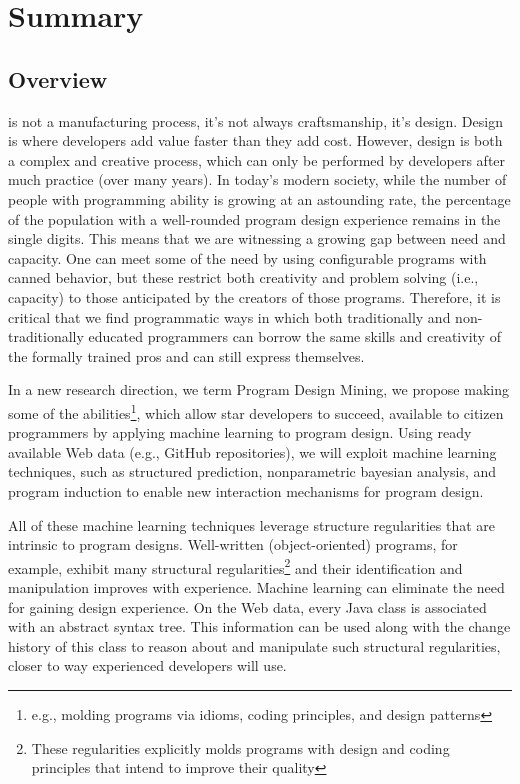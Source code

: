 \chapter{Summary}{}
\label{sec:intro}

\section*{Overview} %
\label{sec:overview}

 is not a manufacturing process, it's not 
always craftsmanship, it's design. Design is where developers add 
value faster than they add cost. However, design is both a complex 
and creative process, which can only be performed by developers after 
much practice (over many years). In today’s modern society, while the 
number of people with programming ability is growing at an astounding 
rate, the percentage of the population with a well-rounded program 
design experience remains in the single digits. This means that we are 
witnessing a growing gap between need and capacity. One can meet some of 
the need by using configurable programs with canned behavior, but these 
restrict both creativity and problem solving (i.e., capacity) to those 
anticipated by the creators of those programs. Therefore, it is critical 
that we find programmatic ways in which both traditionally and 
non-traditionally educated programmers can borrow the same skills and 
creativity of the formally trained pros and can still express themselves.

In a new research direction, we term Program Design Mining, we propose  
making some of the abilities\footnote{e.g., molding programs via idioms, 
coding principles, and design patterns}, which allow star developers to 
succeed, available to citizen programmers by applying machine learning 
to program design.  Using ready available Web data (e.g., 
GitHub repositories), we will exploit machine learning techniques, such 
as structured prediction, nonparametric bayesian analysis, and program 
induction to enable new interaction mechanisms for program design.

All of these machine learning techniques leverage structure regularities 
that are intrinsic to program designs. Well-written (object-oriented) 
programs, for example, exhibit many structural regularities\footnote{These 
regularities explicitly molds programs with design and coding principles that 
intend to improve their quality} and their identification and manipulation 
improves with experience. Machine learning can eliminate the need for 
gaining design experience. On the Web data, every Java class is associated 
with an abstract syntax tree. This information can be used along with the 
change history of this class to reason about and manipulate such structural 
regularities, closer to way experienced developers will use. 

